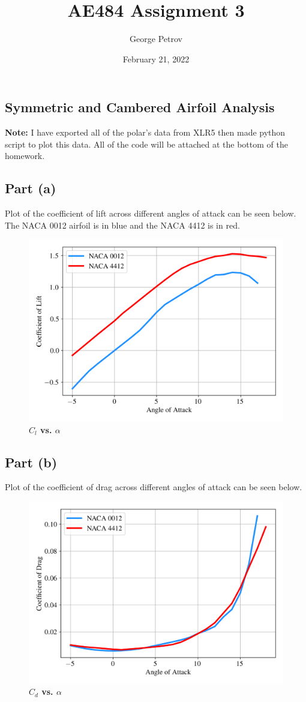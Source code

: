 

\title{AE484 Assignment 3}
\author{George Petrov}
\date{February 21, 2022}



\maketitle
\begin{singlespace}
\section{Symmetric and Cambered Airfoil Analysis}
\textbf{Note:} I have exported all of the polar's data from XLR5 then made python script to plot this data. All of the code will be attached at the bottom of the homework.
\subsection{Part (a)}
Plot of the coefficient of lift across different angles of attack can be seen below. The NACA 0012 airfoil is in blue and the NACA 4412 is in red.
\begin{figure}[H]
        \centering
        \includegraphics[width=.7\textwidth]{homeworks/homework3/george/plots/problem1_a.png}
        \caption{\textbf{$C_l$ vs. $\alpha$}}
        \label{fig:1a}
\end{figure}
\subsection{Part (b)}
Plot of the coefficient of drag across different angles of attack can be seen below.
\begin{figure}[H]
        \centering
        \includegraphics[width=.7\textwidth]{homeworks/homework3/george/plots/problem1_b.png}
        \caption{\textbf{$C_d$ vs. $\alpha$}}
        \label{fig:1b}
\end{figure}

\end{singlespace}
